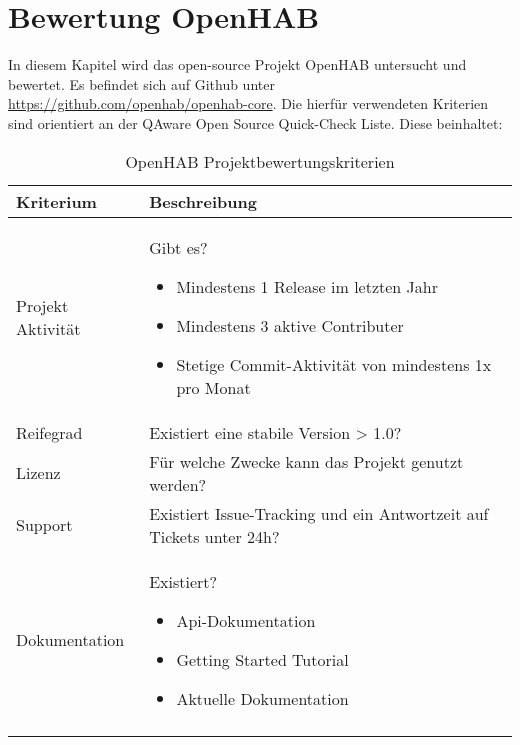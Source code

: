 \section{Bewertung OpenHAB}
In diesem Kapitel wird das open-source Projekt OpenHAB untersucht und bewertet. Es befindet sich auf Github unter \url{https://github.com/openhab/openhab-core}. Die hierfür verwendeten Kriterien sind orientiert an der QAware Open Source Quick-Check Liste.
Diese beinhaltet:
\begin{longtable}{| p{3cm} | p{12cm}|}
	\hline
	\textbf{Kriterium} & \textbf{Beschreibung} \\
	\hline \hline
	\centering Projekt Aktivität & Gibt es?
	\begin{itemize}
		\item Mindestens 1 Release im letzten Jahr
		\item Mindestens 3 aktive Contributer
		\item Stetige Commit-Aktivität von mindestens 1x pro Monat
	\end{itemize}\\
	\hline
	\centering Reifegrad & Existiert eine stabile Version > 1.0?  \\
	\hline
	\centering Lizenz & Für welche Zwecke kann das Projekt genutzt werden? \\
	\hline
	\centering Support & Existiert Issue-Tracking und ein Antwortzeit auf Tickets unter 24h? \\
	\hline
	\centering Dokumentation & Existiert?
	\begin{itemize}
		\item Api-Dokumentation
		\item Getting Started Tutorial
		\item Aktuelle Dokumentation
	\end{itemize} \\
	\hline
	\caption{OpenHAB Projektbewertungskriterien}
	\label{table:openhab-judgement-criteria}
\end{longtable}

